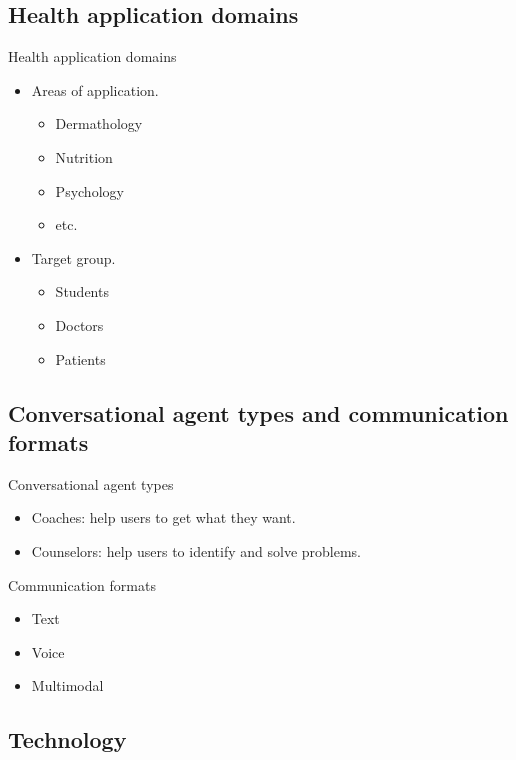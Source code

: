 \documentclass{beamer}
\begin{document}
\subsection{Health application domains}
\begin{frame}[fragile]{Health application domains}
  \begin{itemize}[<+->]
    \item Areas of application.
    \begin{itemize}[<+->]
      \item Dermathology
      \item Nutrition
      \item Psychology
      \item etc.
    \end{itemize}
    \item Target group.
    \begin{itemize}[<+->]
      \item Students
      \item Doctors
      \item Patients
    \end{itemize}
  \end{itemize}
\end{frame}


\subsection{Conversational agent types and communication formats}

\begin{frame}[fragile]{Conversational agent types}
  \begin{itemize}[<+->]
    \item Coaches: help users to get what they want.
    \item Counselors: help users to identify and solve problems.
  \end{itemize}
\end{frame}
\begin{frame}[fragile]{Communication formats}
  \begin{itemize}[<+->]
    \item Text
    \item Voice
    \item Multimodal
  \end{itemize}
\end{frame}
\subsection{Technology}
\end{document}
